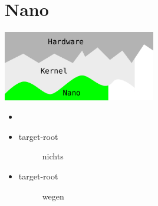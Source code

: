 \section{Nano}
\begin{frame}
\begin{center}
\includegraphics[width=0.5\textwidth]{nano.pdf}
\end{center}
\begin{itemize}
 \item {}
 \item {}
 \begin{description}
  \item[target-root] nichts
 \end{description}
 \item {}
 \begin{description}
  \item[target-root]  wegen 
 \end{description}
\end{itemize}
\end{frame}
